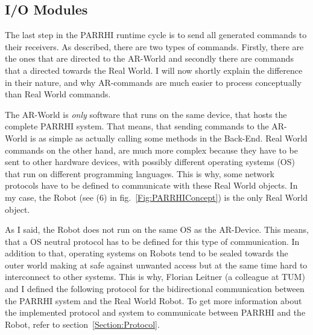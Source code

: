 \subsection{I/O Modules}

The last step in the PARRHI runtime cycle is to send all generated commands to their receivers. As described, there are two types of commands. Firstly, there are the ones that are directed to the AR-World and secondly there are commands that a directed towards the Real World. I will now shortly explain the difference in their nature, and why AR-commands are much easier to process conceptually than Real World commands.

The AR-World is \textit{only} software that runs on the same device, that hosts the complete PARRHI system. That means, that sending commands to the AR-World is as simple as actually calling some methods in the Back-End. Real World commands on the other hand, are much more complex because they have to be sent to other hardware devices, with possibly different operating systems (OS) that run on different programming languages. This is why, some network protocols have to be defined to communicate with these Real World objects. In my case, the Robot (see (6) in fig.~\ref{Fig:PARRHIConcept}) is the only Real World object.

As I said, the Robot does not run on the same OS as the AR-Device. This means, that a OS neutral protocol has to be defined for this type of communication. In addition to that, operating systems on Robots tend to be sealed towards the outer world making at safe against unwanted access but at the same time hard to interconnect to other systems. This is why, Florian Leitner (a colleague at TUM) and I defined the following protocol for the bidirectional communication between the PARRHI system and the Real World Robot. To get more information about the implemented protocol and system to communicate between PARRHI and the Robot, refer to section~\ref{Section:Protocol}.



























